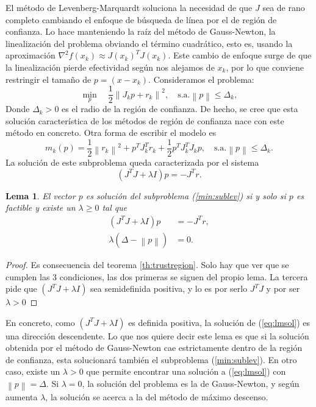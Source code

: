 \documentclass[11pt,a4paper]{book}
\newtheorem{lemma}[theorem]{Lema}
\theoremstyle{definition}
\theoremstyle{remark}
\newcommand{\norm}[1]{\left\lVert#1\right\rVert}
\begin{document}
El método de Levenberg-Marquardt soluciona la necesidad de que $J$ sea de rano completo cambiando el enfoque de búsqueda de línea por el de región de confianza.
Lo hace manteniendo la raíz del método de Gauss-Newton, la linealización del problema obviando el término cuadrático, esto es, usando la aproximación $\nabla^2 f(x_k) \approx J(x_k)^TJ(x_k)$.
Este cambio de enfoque surge de que la linealización pierde efectividad según nos alejamos de $x_k$, por lo que conviene restringir el tamaño de $p=(x-x_k)$. Consideramos el problema:
\begin{equation}
\label{min:sublev}
	\min_{p} \quad \frac{1}{2} \norm{J_kp+r_k}^2,\quad \text{s.a.} \norm{p} \leq \Delta_k,
\end{equation}
Donde $\Delta_k>0$ es el radio de la región de confianza.
De hecho, se cree que esta solución característica de los métodos de región de confianza nace con este método en concreto. Otra forma de escribir el modelo es
\begin{equation}
	m_k(p)=\frac{1}{2}\norm{r_k}^2 + p^TJ_k^Tr_k + \frac{1}{2}p^TJ_k^TJ_kp,
	\quad \text{s.a.} \norm{p} \leq \Delta_k.
\end{equation}
La solución de este subproblema queda caracterizada por el sistema
\begin{equation}
	\label{eq:lmsol}
	(J^TJ+\lambda I)p=-J^Tr.
\end{equation}
\begin{lemma}
El vector $p$ es solución del subproblema (\ref{min:sublev}) si y solo si $p$ es factible y existe un $\lambda \geq 0$ tal que
\begin{align}
	(J^TJ+\lambda I)p&=-J^Tr, \\
	\lambda (\Delta-\norm{p})&=0.
\end{align}
\end{lemma}
\begin{proof}
Es consecuencia del teorema \ref{th:trustregion}. Solo hay que ver que se cumplen las 3 condiciones, las dos primeras se siguen del propio lema. La tercera pide que $(J^TJ+\lambda I)$ sea semidefinida positiva, y lo es por serlo $J^TJ$ y por ser $\lambda>0$
\end{proof}

En concreto, como $(J^TJ+\lambda I)$ es definida positiva, la solución de (\ref{eq:lmsol}) es una dirección descendente. Lo que nos quiere decir este lema es que si la solución obtenida por el método de Gauss-Newton cae estrictamente dentro de la región de confianza, esta solucionará también el subproblema (\ref{min:sublev}).
En otro caso, existe un $\lambda>0$ que permite encontrar una solución a (\ref{eq:lmsol})
con $\norm{p}=\Delta$. Si $\lambda=0$, la solución del problema es la de Gauss-Newton, y según aumenta $\lambda$, la solución se acerca a la del método de máximo descenso.
\end{document}
